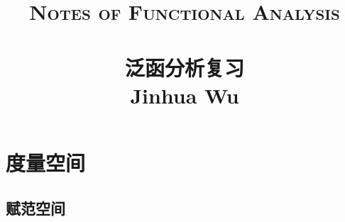 
\usepackage{float}
\usepackage{enumitem}
\usepackage{amsmath}
\usepackage{amssymb}
\usepackage{hyperref}
\usepackage{cleveref}
\usepackage{annotate-equations}
\usepackage{zhlipsum}
\title{ \normalsize \textsc{Notes of Functional Analysis}
		\\ [2.0cm]
		\HRule{1.5pt} \\
		\LARGE \textbf{\uppercase{泛函分析复习}
		\HRule{2.0pt} \\ [0.6cm] \LARGE{Jinhua Wu} \vspace*{10\baselineskip}}
		}
\date{}
\author{}
\newcommand{\weak}{\rightharpoonup}

\maketitle
\tableofcontents 
\newpage
\setcounter{page}{1}
\chapter{度量空间}
\section{赋范空间}

